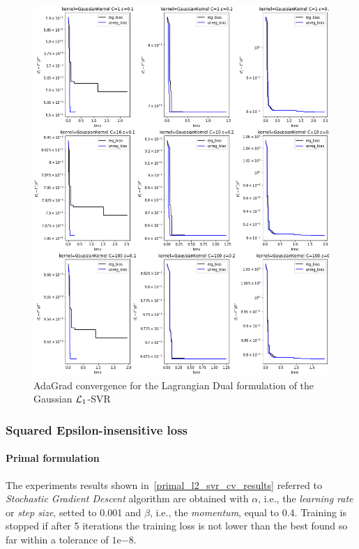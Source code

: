 \begin{figure}[H]
	\centering
	\includegraphics[scale=0.55]{img/gaussian_lagrangian_dual_l1_svr_loss_history}
	\caption{AdaGrad convergence for the Lagrangian Dual formulation of the Gaussian $\protect \mathcal{L}_1$-SVR}
	\label{fig:gaussian_lagrangian_dual_l1_svr_loss_history}
\end{figure}

\pagebreak

\subsubsection{Squared Epsilon-insensitive loss}

\paragraph{Primal formulation}

The experiments results shown in~\ref{primal_l2_svr_cv_results} referred to \emph{Stochastic Gradient Descent} algorithm are obtained with $\alpha$, i.e., the \emph{learning rate} or \emph{step size}, setted to 0.001 and $\beta$, i.e., the \emph{momentum}, equal to 0.4. Training is stopped if after 5 iterations the training loss is not lower than the best found so far within a tolerance of $1\mathrm{e}{-8}$.

